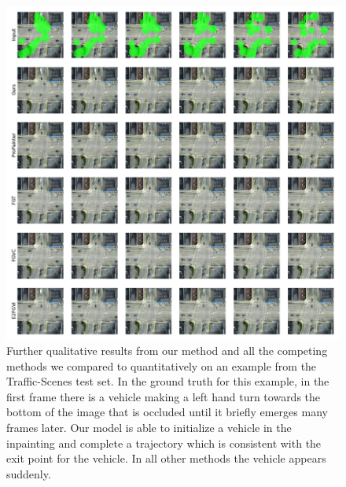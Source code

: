 \begin{figure}[t]
\begin{center}
    \centering
    \captionsetup{type=figure}
    \includegraphics[width=\linewidth]{figures/additional-samples/ts2.pdf}
    \caption[Further qualitative results from our method and all competing methods on another example from the Traffic-Scenes test set.]{Further qualitative results from our method and all the competing methods we compared to quantitatively on an example from the Traffic-Scenes test set. In the ground truth for this example, in the first frame there is a vehicle making a left hand turn towards the bottom of the image that is occluded until it briefly emerges many frames later. Our model is able to initialize a vehicle in the inpainting and complete a trajectory which is consistent with the exit point for the vehicle. In all other methods the vehicle appears suddenly. } 
    \label{fig:ts2}
\end{center}
\end{figure}

